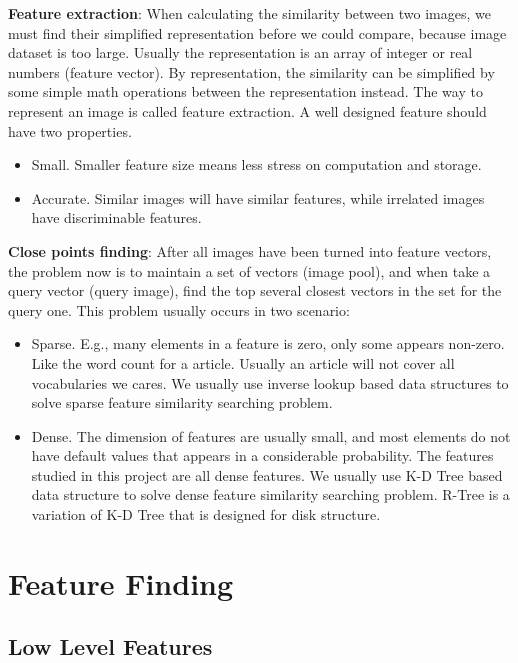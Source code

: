 \documentclass{acm_proc_article-sp}
\begin{document}
\textbf{Feature extraction}: When calculating the similarity between two
images, we must find their simplified representation before we could compare,
because image dataset is too large. Usually the representation is an array of
integer or real numbers (feature vector). By representation, the similarity can
be simplified by some simple math operations between the representation
instead. The way to represent an image is called feature extraction. A well
designed feature should have two properties.
\begin{itemize}
\item Small. Smaller feature size means less stress on computation and storage.
\item Accurate. Similar images will have similar features, while irrelated
        images have discriminable features.
\end{itemize}

\textbf{Close points finding}: After all images have been turned into feature
vectors, the problem now is to maintain a set of vectors (image pool), and when
take a query vector (query image), find the top several closest vectors in the
set for the query one. This problem usually occurs in two scenario:
\begin{itemize}
        \item Sparse. E.g., many elements in a feature is zero, only some
                appears non-zero. Like the word count for a article. Usually an
                article will not cover all vocabularies we cares. We usually
                use inverse lookup based data structures to solve sparse
                feature similarity searching problem.
        \item Dense. The dimension of features are usually small, and most
                elements do not have default values that appears in a
                considerable probability. The features studied in this project
                are all dense features. We usually use K-D Tree based data
                structure to solve dense feature similarity searching problem.
                R-Tree is a variation of K-D Tree that is designed for disk
                structure.
\end{itemize}

\section{Feature Finding}
\subsection{Low Level Features}
\end{document}
